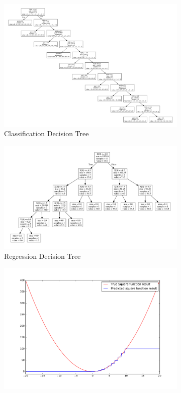 \begin{figure}[!h]
  \centering
  \begin{subfigure}{.49\textwidth}
        \centering
        \includegraphics[width=\linewidth]{figures/clas_tree.pdf}
        \caption{Classification Decision Tree}
    \end{subfigure} %
    \begin{subfigure}{0.49\textwidth}
        \centering
        \includegraphics[width=\linewidth]{figures/reg_tree.pdf}
        \caption{Regression Decision Tree}
    \end{subfigure}
  \begin{subfigure}{.49\textwidth}
        \centering
        \includegraphics[width=\linewidth]{figures/clf_tree_plot.pdf}

\end{subfigure}
\end{figure}
